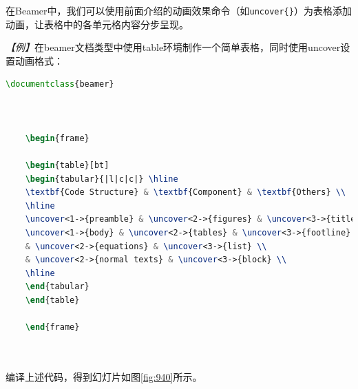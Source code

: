在Beamer中，我们可以使用前面介绍的动画效果命令（如\texttt{uncover\{\}}）为表格添加动画，让表格中的各单元格内容分步呈现。

\emph{【例】}在beamer文档类型中使用table环境制作一个简单表格，同时使用uncover设置动画格式：
\begin{lstlisting}[language=TeX]
    \documentclass{beamer}

    

    \begin{frame}

    \begin{table}[bt]
    \begin{tabular}{|l|c|c|} \hline
    \textbf{Code Structure} & \textbf{Component} & \textbf{Others} \\
    \hline
    \uncover<1->{preamble} & \uncover<2->{figures} & \uncover<3->{title} \\
    \uncover<1->{body} & \uncover<2->{tables} & \uncover<3->{footline} \\
    & \uncover<2->{equations} & \uncover<3->{list} \\
    & \uncover<2->{normal texts} & \uncover<3->{block} \\
    \hline
    \end{tabular}
    \end{table}

    \end{frame}

    
\end{lstlisting}

编译上述代码，得到幻灯片如图\ref{fig:940}所示。

